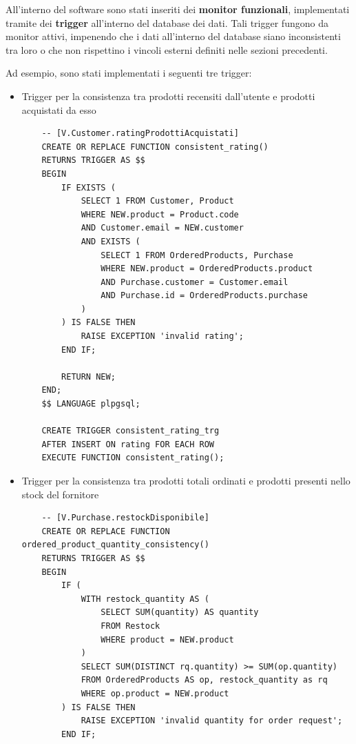 \documentclass[12pt]{report}
\begin{document}
    All'interno del software sono stati inseriti dei \textbf{monitor funzionali}, implementati tramite dei \textbf{trigger} all'interno del database dei dati. Tali trigger fungono da monitor attivi, impenendo che i dati all'interno del database siano inconsistenti tra loro o che non rispettino i vincoli esterni definiti nelle sezioni precedenti.

    Ad esempio, sono stati implementati i seguenti tre trigger:

    \begin{itemize}
    \item Trigger per la consistenza tra prodotti recensiti dall'utente e prodotti acquistati da esso

    \begin{verbatim}
    -- [V.Customer.ratingProdottiAcquistati]
    CREATE OR REPLACE FUNCTION consistent_rating()
    RETURNS TRIGGER AS $$
    BEGIN
        IF EXISTS (
            SELECT 1 FROM Customer, Product
            WHERE NEW.product = Product.code
            AND Customer.email = NEW.customer
            AND EXISTS (
                SELECT 1 FROM OrderedProducts, Purchase
                WHERE NEW.product = OrderedProducts.product
                AND Purchase.customer = Customer.email
                AND Purchase.id = OrderedProducts.purchase
            )
        ) IS FALSE THEN
            RAISE EXCEPTION 'invalid rating';
        END IF;
    
        RETURN NEW;
    END;
    $$ LANGUAGE plpgsql;
    
    CREATE TRIGGER consistent_rating_trg
    AFTER INSERT ON rating FOR EACH ROW
    EXECUTE FUNCTION consistent_rating();
    \end{verbatim}

    \item Trigger per la consistenza tra prodotti totali ordinati e prodotti presenti nello stock del fornitore

    \begin{verbatim}
    -- [V.Purchase.restockDisponibile]
    CREATE OR REPLACE FUNCTION ordered_product_quantity_consistency()
    RETURNS TRIGGER AS $$
    BEGIN
        IF (
            WITH restock_quantity AS (
                SELECT SUM(quantity) AS quantity
                FROM Restock
                WHERE product = NEW.product
            )
            SELECT SUM(DISTINCT rq.quantity) >= SUM(op.quantity)
            FROM OrderedProducts AS op, restock_quantity as rq
            WHERE op.product = NEW.product
        ) IS FALSE THEN
            RAISE EXCEPTION 'invalid quantity for order request';
        END IF;
    

\end{verbatim}
\end{itemize}
\end{document}
